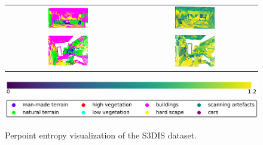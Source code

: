 \begin{figure}[h!]
\begin{tabular}{cc}
            \includegraphics[width=0.33\textwidth, height=0.18\textheight]{images/seg_output/s3dis_DE/S3DIS_3_Pred.pdf}& 
            \includegraphics[width=0.33\textwidth, height=0.18\textheight]{images/seg_output/flipout/ent_de_s3dis_2.pdf}\\

            \includegraphics[width=0.33\textwidth, height=0.18\textheight]{images/seg_output/s3dis_DE/S3DIS_4_Pred.pdf}& 
            \includegraphics[width=0.33\textwidth, height=0.18\textheight]{images/seg_output/flipout/ent_de_s3dis_4.pdf}\\
        \end{tabular}
        \includegraphics[scale=0.45]{images/ent_legend.pdf}
        \includegraphics[scale=0.45]{images/legend.png}
        \caption{Perpoint entropy visualization of the S3DIS dataset.}
        \label{fig:de_s3dis_entmap}
    \end{figure}
